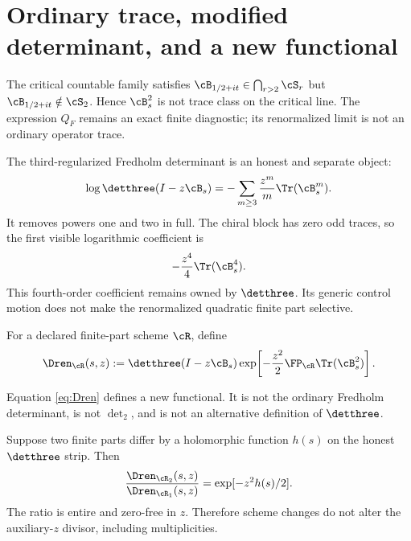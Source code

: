 \section{Ordinary trace, modified determinant, and a new functional}
\label{sec:ownership}

The critical countable family satisfies
$\cB_{1/2+it}\in\bigcap_{r>2}\cS_r$ but
$\cB_{1/2+it}\notin\cS_2$.  Hence $\cB_s^2$ is not trace class on the
critical line.  The expression $Q_F$ remains an exact finite diagnostic; its
renormalized limit is not an ordinary operator trace.

The third-regularized Fredholm determinant is an honest and separate object:
\begin{equation}
 \log\detthree(I-z\cB_s)
 =-\sum_{m\ge3}\frac{z^m}{m}\Tr(\cB_s^m).
 \label{eq:det3-log}
\end{equation}
It removes powers one and two in full.  The chiral block has zero odd traces,
so the first visible logarithmic coefficient is
\begin{equation}
 -\frac{z^4}{4}\Tr(\cB_s^4).
 \label{eq:first-visible}
\end{equation}
This fourth-order coefficient remains owned by $\detthree$.  Its generic
control motion does not make the renormalized quadratic finite part
selective.

\begin{definition}
For a declared finite-part scheme $\cR$, define
\begin{equation}
 \Dren_{\cR}(s,z)
 :=\detthree(I-z\cB_s)
 \exp\!\left[-\frac{z^2}{2}
 \FP_{\cR}\Tr(\cB_s^2)\right].
 \label{eq:Dren}
\end{equation}
\end{definition}

Equation \eqref{eq:Dren} defines a new functional.  It is not the ordinary
Fredholm determinant, is not $\det_2$, and is not an alternative definition
of $\detthree$.

\begin{proposition}
\label{prop:divisor}
Suppose two finite parts differ by a holomorphic function $h(s)$ on the
honest $\detthree$ strip.  Then
\begin{equation}
 \frac{\Dren_{\cR_2}(s,z)}{\Dren_{\cR_1}(s,z)}
 =\exp[-z^2h(s)/2].
 \label{eq:scheme-ratio}
\end{equation}
The ratio is entire and zero-free in $z$.  Therefore scheme changes do not
alter the auxiliary-$z$ divisor, including multiplicities.
\end{proposition}

